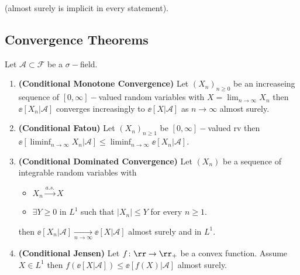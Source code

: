 \documentclass[../main.tex]{subfiles}
\begin{document}
    (almost surely is implicit in every statement).
    
    \newpage
    \subsection{Convergence Theorems}
    \begin{theorem}
        Let $\mathcal{A} \subset \mathcal{F}$ be a $\sigma-$field.
        \begin{enumerate}
          \item \textbf{\sffamily (Conditional Monotone Convergence)}
            Let $(X_n)_{n \geq 0}$ be an increaseing sequence of $[0, \infty]-$valued
            random variables with $X = \lim_{n \to \infty} X_n$ then $\ee[X_n | \mathcal{A}]$ 
            converges increasingly to $\ee[X | \mathcal{A}]$ as $n \to \infty$
            almost surely.

          \item \textbf{\sffamily (Conditional Fatou)}
            Let $(X_n)_{n \geq 1}$ be $[0, \infty]-$valued rv then
            $\ee[\liminf_{n \to \infty} X_n | \mathcal{A} ] \leq \liminf_{n \to
            \infty}\ee[X_n | \mathcal{A}]$.

          \item \textbf{\sffamily (Conditional Dominated Convergence)}
            Let $(X_n)$ be a sequence of integrable random variables with
            \begin{itemize}
              \item $X_n \overset{a.s.}{\longrightarrow} X$
              \item $\exists Y \geq 0$ in $L^1$ such that $|X_n| \leq Y$ for
                every $n \geq 1$.
            \end{itemize}
            then $\ee[X_n | \mathcal{A}] \underset{n \to
            \infty}{\longrightarrow} \ee[X | \mathcal{A}]$ almost surely and in
            $L^1$.

          \item \textbf{\sffamily (Conditional Jensen)}
            Let $f \colon \rr \to \rr_+$ be a convex function. Assume $X \in L^1$
            then $f(\ee[X | \mathcal{A}]) \leq \ee[f(X) | \mathcal{A}]$ almost
            surely.

        \end{enumerate}
    \end{theorem}
\end{document}
